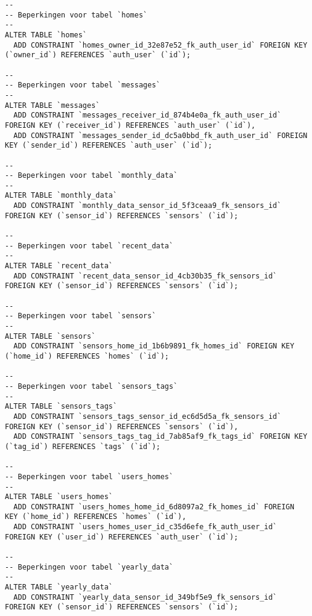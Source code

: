 \documentclass[11pt]{article}
\begin{document}
\begin{lstlisting}[style=SQL]
--
-- Beperkingen voor tabel `homes`
--
ALTER TABLE `homes`
  ADD CONSTRAINT `homes_owner_id_32e87e52_fk_auth_user_id` FOREIGN KEY (`owner_id`) REFERENCES `auth_user` (`id`);

--
-- Beperkingen voor tabel `messages`
--
ALTER TABLE `messages`
  ADD CONSTRAINT `messages_receiver_id_874b4e0a_fk_auth_user_id` FOREIGN KEY (`receiver_id`) REFERENCES `auth_user` (`id`),
  ADD CONSTRAINT `messages_sender_id_dc5a0bbd_fk_auth_user_id` FOREIGN KEY (`sender_id`) REFERENCES `auth_user` (`id`);

--
-- Beperkingen voor tabel `monthly_data`
--
ALTER TABLE `monthly_data`
  ADD CONSTRAINT `monthly_data_sensor_id_5f3ceaa9_fk_sensors_id` FOREIGN KEY (`sensor_id`) REFERENCES `sensors` (`id`);

--
-- Beperkingen voor tabel `recent_data`
--
ALTER TABLE `recent_data`
  ADD CONSTRAINT `recent_data_sensor_id_4cb30b35_fk_sensors_id` FOREIGN KEY (`sensor_id`) REFERENCES `sensors` (`id`);

--
-- Beperkingen voor tabel `sensors`
--
ALTER TABLE `sensors`
  ADD CONSTRAINT `sensors_home_id_1b6b9891_fk_homes_id` FOREIGN KEY (`home_id`) REFERENCES `homes` (`id`);

--
-- Beperkingen voor tabel `sensors_tags`
--
ALTER TABLE `sensors_tags`
  ADD CONSTRAINT `sensors_tags_sensor_id_ec6d5d5a_fk_sensors_id` FOREIGN KEY (`sensor_id`) REFERENCES `sensors` (`id`),
  ADD CONSTRAINT `sensors_tags_tag_id_7ab85af9_fk_tags_id` FOREIGN KEY (`tag_id`) REFERENCES `tags` (`id`);

--
-- Beperkingen voor tabel `users_homes`
--
ALTER TABLE `users_homes`
  ADD CONSTRAINT `users_homes_home_id_6d8097a2_fk_homes_id` FOREIGN KEY (`home_id`) REFERENCES `homes` (`id`),
  ADD CONSTRAINT `users_homes_user_id_c35d6efe_fk_auth_user_id` FOREIGN KEY (`user_id`) REFERENCES `auth_user` (`id`);

--
-- Beperkingen voor tabel `yearly_data`
--
ALTER TABLE `yearly_data`
  ADD CONSTRAINT `yearly_data_sensor_id_349bf5e9_fk_sensors_id` FOREIGN KEY (`sensor_id`) REFERENCES `sensors` (`id`);
\end{lstlisting}
\end{document}
